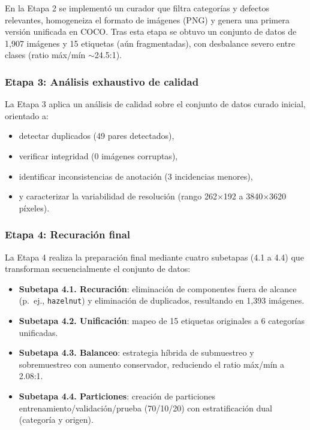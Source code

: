 En la Etapa 2 se implementó un curador que filtra categorías y defectos relevantes, homogeneiza el formato de imágenes (PNG) y genera una primera versión unificada en COCO. Tras esta etapa se obtuvo un conjunto de datos de 1{,}907 imágenes y 15 etiquetas (aún fragmentadas), con desbalance severo entre clases (ratio máx/mín $\sim$24.5:1).

\subsubsection{Etapa 3: Análisis exhaustivo de calidad}

La Etapa 3 aplica un análisis de calidad sobre el conjunto de datos curado inicial, orientado a:
\begin{itemize}
    \item detectar duplicados (49 pares detectados),
    \item verificar integridad (0 imágenes corruptas),
    \item identificar inconsistencias de anotación (3 incidencias menores),
    \item y caracterizar la variabilidad de resolución (rango 262$\times$192 a 3840$\times$3620 píxeles).
\end{itemize}

\subsubsection{Etapa 4: Recuración final}

La Etapa 4 realiza la preparación final mediante cuatro subetapas (4.1 a 4.4) que transforman secuencialmente el conjunto de datos:
\begin{itemize}
    \item \textbf{Subetapa 4.1. Recuración}: eliminación de componentes fuera de alcance (p.\ ej., \texttt{hazelnut}) y eliminación de duplicados, resultando en 1{,}393 imágenes.
    \item \textbf{Subetapa 4.2. Unificación}: mapeo de 15 etiquetas originales a 6 categorías unificadas.
    \item \textbf{Subetapa 4.3. Balanceo}: estrategia híbrida de submuestreo y sobremuestreo con aumento conservador, reduciendo el ratio máx/mín a 2.08:1.
    \item \textbf{Subetapa 4.4. Particiones}: creación de particiones entrenamiento/validación/prueba (70/10/20) con estratificación dual (categoría y origen).
\end{itemize}

